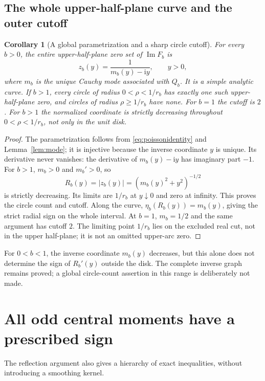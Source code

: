 \documentclass[11pt]{article}
\numberwithin{equation}{section}
\newtheorem{corollary}[theorem]{Corollary}
\theoremstyle{definition}
\theoremstyle{remark}
\DeclareMathOperator{\Imn}{Im}
\newcommand{\ii}{\mathrm i}
\begin{document}
\subsection{The whole upper-half-plane curve and the outer cutoff}
\begin{corollary}[A global parametrization and a sharp circle cutoff]
\label{cor:cutoff}
For every $b>0$, the entire upper-half-plane zero set of $\Imn F_b$ is
\begin{equation}\label{eq:globalcurve}
 z_b(y)=\frac1{m_b(y)-\ii y},\qquad y>0,
\end{equation}
where $m_b$ is the unique Cauchy mode associated with $Q_b$.
It is a simple analytic curve. If $b>1$, every circle of radius
$0<\rho<1/r_b$ has exactly one such upper-half-plane zero, and circles
of radius $\rho\ge1/r_b$ have none. For $b=1$ the cutoff is $2$.
For $b>1$ the normalized coordinate is strictly decreasing throughout
$0<\rho<1/r_b$, not only in the unit disk.
\end{corollary}
\begin{proof}
The parametrization follows from \eqref{eq:poissonidentity} and
Lemma~\ref{lem:mode}; it is injective because the inverse coordinate
$y$ is unique. Its derivative never vanishes: the derivative of
$m_b(y)-\ii y$ has imaginary part $-1$.
For $b>1$, $m_b>0$ and $m_b'>0$, so
\[
 R_b(y)=|z_b(y)|=(m_b(y)^2+y^2)^{-1/2}
\]
is strictly decreasing. Its limits are $1/r_b$ at $y\downarrow0$
and zero at infinity. This proves the circle count and cutoff.
Along the curve, $\eta_b(R_b(y))=m_b(y)$, giving the strict radial
sign on the whole interval. At $b=1$, $m_b=1/2$ and the same argument
has cutoff $2$. The limiting point $1/r_b$ lies on the excluded real
cut, not in the upper half-plane; it is not an omitted upper-arc zero.
\end{proof}

For $0<b<1$, the inverse coordinate $m_b(y)$ decreases, but this alone
does not determine the sign of $R_b'(y)$ outside the disk. The complete
inverse graph remains proved; a global circle-count assertion in this
range is deliberately not made.

\section{All odd central moments have a prescribed sign}
\label{sec:moments}
The reflection argument also gives a hierarchy of exact inequalities,
without introducing a smoothing kernel.
\end{document}

